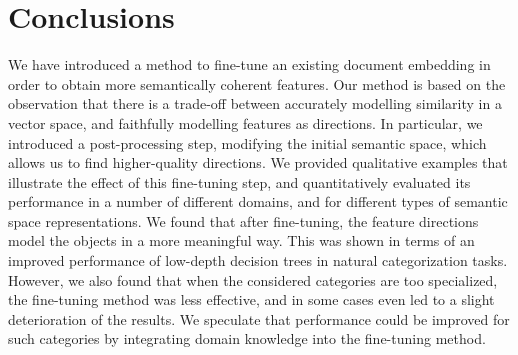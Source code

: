 \section{Conclusions}
We have introduced a method to fine-tune an existing document embedding in order to obtain more semantically coherent  features. Our method is based on the observation that there is a trade-off between accurately modelling similarity in a vector space, and faithfully modelling features as directions. In particular, we introduced a post-processing step, modifying the initial semantic space, which allows us to find higher-quality directions. We provided qualitative examples that illustrate the effect of this fine-tuning step, and quantitatively evaluated its performance in a number of different domains, and for different types of semantic space representations. We found that after fine-tuning, the feature directions model the objects in a more meaningful way. This was shown in terms of an improved performance of low-depth decision trees in natural categorization tasks. However, we also found that when the considered categories are too specialized, the fine-tuning method was less effective, and in some cases even led to a slight deterioration of the results. We speculate that performance could be improved for such categories by integrating domain knowledge into the fine-tuning method. 








